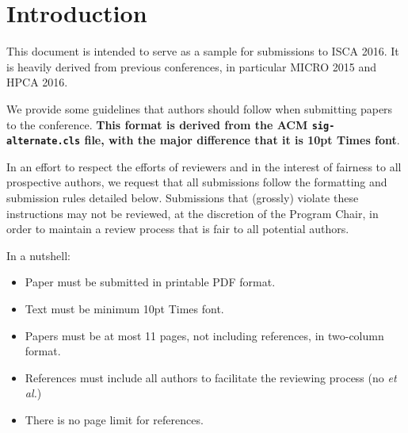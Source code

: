 \section{Introduction}

This document is intended to serve as a sample for submissions to ISCA 2016. It is heavily derived from previous conferences, in particular MICRO 2015 and HPCA 2016.

We provide some guidelines that authors should follow when submitting papers to the conference. \textbf{This format is derived from the ACM \texttt{sig-alternate.cls} file, with the major difference that it is 10pt Times font}.

In an effort to respect the efforts of reviewers and in the interest of fairness to all prospective authors, we request that all submissions follow the formatting and submission rules detailed below. Submissions that (grossly) violate these instructions may not be reviewed, at the discretion of the Program Chair, in order to maintain a review process that is fair to all potential authors.

\vspace{1ex}In a nutshell:

\begin{itemize}
\item Paper must be submitted in printable PDF format.
\item Text must be minimum 10pt Times font.
\item Papers must be at most 11 pages, not including references, in two-column format.
\item References must include all authors to facilitate the reviewing process (no \emph{et al.})
\item There is no page limit for references.
\end{itemize}